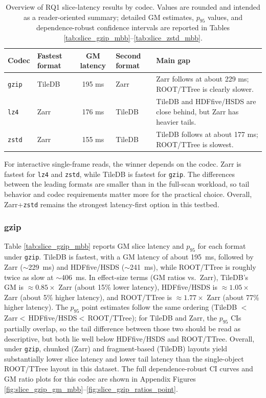 \documentclass[nomenclature, english, bibtex]{kththesis}
\numberwithin{listing}{chapter}
\begin{document}
\begin{table}[H]
  \centering
  \small
  \caption{Overview of RQ1 slice-latency results by codec. Values are rounded and intended as a reader-oriented summary; detailed \gls{GM} estimates, $p_{95}$ values, and dependence-robust confidence intervals are reported in Tables \ref{tab:slice_gzip_mbb}--\ref{tab:slice_zstd_mbb}.}
  \label{tab:rq1_slice_overview}
  \begin{tabularx}{\linewidth}{@{} l l c l X @{}}
    \toprule
    Codec & Fastest format & \gls{GM} latency & Second format & Main gap \\
    \midrule
    \texttt{gzip} & TileDB & 195 ms & Zarr & Zarr follows at about 229 ms; \gls{ROOT}/\gls{TTree} is clearly slower. \\
    \texttt{lz4}  & Zarr   & 176 ms & TileDB & TileDB and \gls{HDFfive}/\gls{HSDS} are close behind, but Zarr has heavier tails. \\
    \texttt{zstd} & Zarr   & 155 ms & TileDB & TileDB follows at about 177 ms; \gls{ROOT}/\gls{TTree} is slowest. \\
    \bottomrule
  \end{tabularx}
\end{table}

For interactive single-frame reads, the winner depends on the codec. Zarr is fastest for \texttt{lz4} and \texttt{zstd}, while TileDB is fastest for \texttt{gzip}. The differences between the leading formats are smaller than in the full-scan workload, so tail behavior and codec requirements matter more for the practical choice. Overall, Zarr+\texttt{zstd} remains the strongest latency-first option in this testbed.

\subsubsection{gzip}
Table \ref{tab:slice_gzip_mbb} reports \gls{GM} slice latency and $p_{95}$ for each format under \texttt{gzip}. TileDB is fastest, with a \gls{GM} latency of about 195~ms, followed by Zarr ($\sim$229~ms) and \gls{HDFfive}/\gls{HSDS} ($\sim$241~ms), while \gls{ROOT}/\gls{TTree} is roughly twice as slow at $\sim$406~ms. In effect-size terms (\gls{GM} ratios vs.\ Zarr), TileDB’s \gls{GM} is $\approx 0.85\times$ Zarr (about 15\% lower latency), \gls{HDFfive}/\gls{HSDS} is $\approx 1.05\times$ Zarr (about 5\% higher latency), and \gls{ROOT}/\gls{TTree} is $\approx 1.77\times$ Zarr (about 77\% higher latency). The $p_{95}$ point estimates follow the same ordering (TileDB $<\,$Zarr$<\,$\gls{HDFfive}/\gls{HSDS}$<\,$\gls{ROOT}/\gls{TTree}); for TileDB and Zarr, the $p_{95}$ CIs partially overlap, so the tail difference between those two should be read as descriptive, but both lie well below \gls{HDFfive}/\gls{HSDS} and \gls{ROOT}/\gls{TTree}. Overall, under \texttt{gzip}, chunked (Zarr) and fragment-based (TileDB) layouts yield substantially lower slice latency and lower tail latency than the single-object \gls{ROOT}/\gls{TTree} layout in this dataset. The full dependence-robust \gls{CI} curves and \gls{GM} ratio plots for this codec are shown in Appendix Figures \ref{fig:slice_gzip_gm_mbb}–\ref{fig:slice_gzip_ratios_point}.
\end{document}
